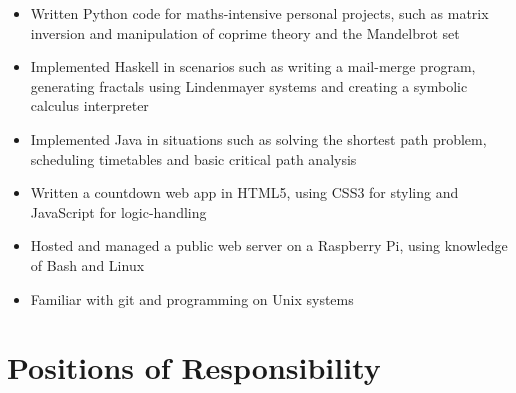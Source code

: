 \documentclass{moderncv}        %
\begin{document}
\begin{itemize}

\item Written Python code for maths-intensive personal projects, such as matrix inversion and manipulation of coprime theory and the Mandelbrot set

\vspace{3pt}

\item Implemented Haskell in scenarios such as writing a mail-merge program, generating fractals using Lindenmayer systems and creating a symbolic calculus interpreter

\vspace{3pt}

\item Implemented Java in situations such as solving the shortest path problem, scheduling timetables and basic critical path analysis

\vspace{3pt}

\item{Written a countdown web app in HTML5, using CSS3 for styling and JavaScript for logic-handling}

\vspace{3pt}

\item Hosted and managed a public web server on a Raspberry Pi, using knowledge of Bash and Linux

\vspace{3pt}

\item Familiar with git and programming on Unix systems

\end{itemize}

\section{Positions of Responsibility}
\end{document}
